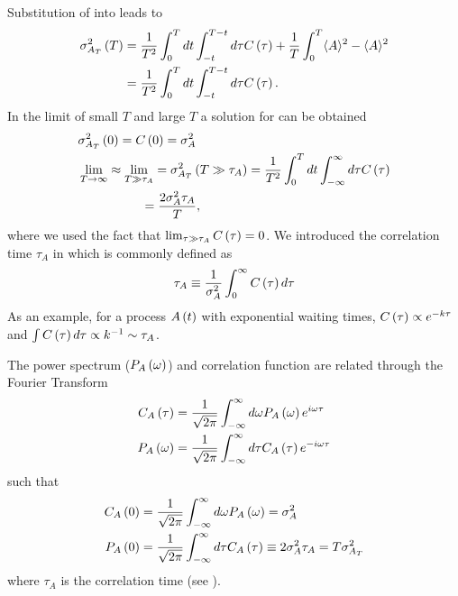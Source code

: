 Substitution of  into  leads to
\begin{align}
\sigma^2_{A_T}\br{T}&=\frac{1}{T^2}\int_0^T dt \int_{-t}^{T-t} d\tau C\br{\tau}+\frac{1}{T}\int_0^T \avg{A}^2-\avg{A}^2\\
\elabel{si:time_av_var4}
&=\frac{1}{T^2}\int_0^T dt \int_{-t}^{T-t} d\tau C\br{\tau}.
\end{align}
In the limit of small $T$ and large $T$ a solution for  can be obtained
\begin{align}
\elabel{si:limT_0_corr}
&\sigma^2_{A_T}\br{0}=C\br{0}=\sigma_A^2\\
\elabel{si:limT_infty_corr}
&\lim_{T\to\infty}\approx \lim_{T\gg \tau_A}=\sigma^2_{A_T}\br{T\gg \tau_A}=\frac{1}{T^2}\int_0^T dt \int_{-\infty}^{\infty} d\tau
C\br{\tau}\nonumber\\
&\quad\qquad\qquad=\frac{2\sigma_A^2\tau_A}{T},
\end{align}
where we used the fact that $\lim_{\tau\gg\tau_A} C\left ( \tau\right )=0$. We introduced the correlation time $\tau_A$ in 
which is commonly defined as
\begin{align}
\elabel{si:corr_time}
\tau_A\equiv \frac{1}{\sigma^2_A}\int_0^\infty C\br{\tau} d\tau
\end{align}
As an example, for a process $A\left ( t\right )$ with exponential waiting times, $C\left ( \tau\right )\propto e^{-k \tau}$ and $\int C\left ( \tau\right )d\tau \propto
k^{-1} \sim \tau_A$.

The power spectrum ($P_A\left ( \omega\right )$) and correlation function are related through the Fourier Transform
\begin{align}
\elabel{si:rel_pow_lap}
C_A\br{\tau}&=\frac{1}{\sqrt{2\pi}}\int_{-\infty}^\infty d\omega P_A\br{\omega}e^{i\omega\tau}\\
P_A\br{\omega}&=\frac{1}{\sqrt{2\pi}}\int_{-\infty}^\infty d\tau C_A\br{\tau}e^{-i\omega\tau}
\end{align}
such that
\begin{align}
C_A\left ( 0\right )&=\frac{1}{\sqrt{2\pi}}\int_{-\infty}^\infty d\omega P_A\left ( \omega\right )=\sigma_A^2\\
P_A\left ( 0\right )&=\frac{1}{\sqrt{2\pi}}\int_{-\infty}^\infty d\tau C_A\left ( \tau\right )\equiv 2\sigma_A^2\tau_A=T\sigma^2_{A_T}
\end{align}
where $\tau_A$ is the correlation time (see ).

